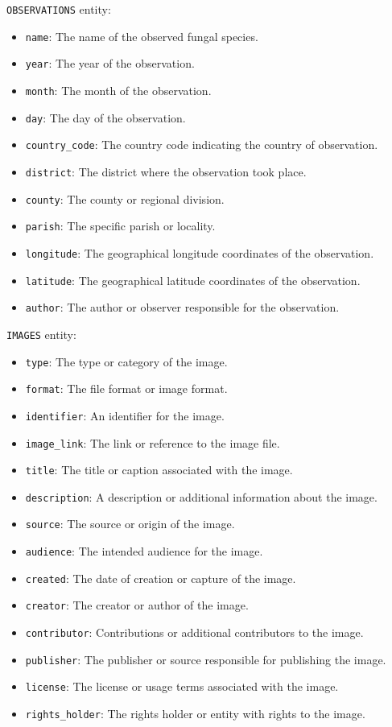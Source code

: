 \texttt{OBSERVATIONS} entity:
\begin{itemize}
    \item \texttt{name}: The name of the observed fungal species.
    \item \texttt{year}: The year of the observation.
    \item \texttt{month}: The month of the observation.
    \item \texttt{day}: The day of the observation.
    \item \texttt{country\_code}: The country code indicating the country of observation.
    \item \texttt{district}: The district where the observation took place.
    \item \texttt{county}: The county or regional division.
    \item \texttt{parish}: The specific parish or locality.
    \item \texttt{longitude}: The geographical longitude coordinates of the observation.
    \item \texttt{latitude}: The geographical latitude coordinates of the observation.
    \item \texttt{author}: The author or observer responsible for the observation.
\end{itemize}

\texttt{IMAGES} entity:
\begin{itemize}
    \item \texttt{type}: The type or category of the image.
    \item \texttt{format}: The file format or image format.
    \item \texttt{identifier}: An identifier for the image.
    \item \texttt{image\_link}: The link or reference to the image file.
    \item \texttt{title}: The title or caption associated with the image.
    \item \texttt{description}: A description or additional information about the image.
    \item \texttt{source}: The source or origin of the image.
    \item \texttt{audience}: The intended audience for the image.
    \item \texttt{created}: The date of creation or capture of the image.
    \item \texttt{creator}: The creator or author of the image.
    \item \texttt{contributor}: Contributions or additional contributors to the image.
    \item \texttt{publisher}: The publisher or source responsible for publishing the image.
    \item \texttt{license}: The license or usage terms associated with the image.
    \item \texttt{rights\_holder}: The rights holder or entity with rights to the image.
\end{itemize}

